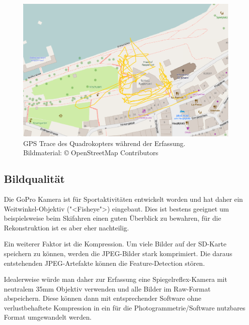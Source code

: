 \begin{figure}[H]
	\centering
	\includegraphics[width=\textwidth]{images/gpstrace_mapnik.png}
	\caption{GPS Trace des Quadrokopters während der Erfassung.\\Bildmaterial:
		\copyright{} OpenStreetMap Contributors}
	\label{img:gpstrace-mapnik}
\end{figure}

\subsection{Bildqualität}\label{workflow:erfassung:bildqualitaet}

Die GoPro Kamera ist für Sportaktivitäten entwickelt worden und hat daher ein
Weitwinkel-Objektiv ("<Fisheye">) eingebaut. Dies ist bestens geeignet um
beispielsweise beim Skifahren einen guten Überblick zu bewahren, für die
Rekonstruktion ist es aber eher nachteilig.

Ein weiterer Faktor ist die Kompression. Um viele Bilder auf der SD-Karte
speichern zu können, werden die JPEG-Bilder stark komprimiert. Die daraus
entstehenden JPEG-Artefakte können die Feature-Detection stören.


Idealerweise würde man daher zur Erfassung eine Spiegelreflex-Kamera mit
neutralem 35mm Objektiv verwenden und alle Bilder im Raw-Format abspeichern.
Diese können dann mit entsprechender Software ohne verlustbehaftete Kompression
in ein für die Photogrammetrie\-/Software nutzbares Format umgewandelt werden.

